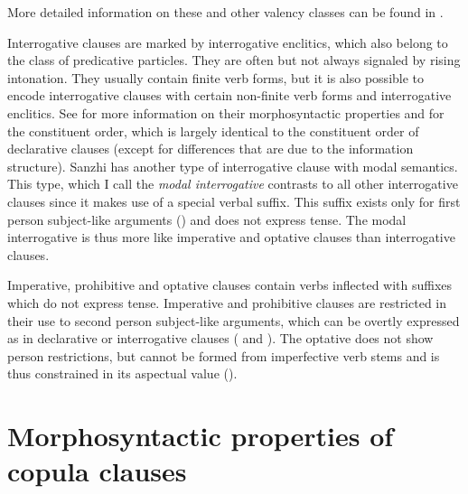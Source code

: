 More detailed information on these and other valency classes can be found in .

Interrogative clauses are marked by interrogative enclitics, which also belong to the class of predicative particles. They are often but not always signaled by rising intonation. They usually contain finite verb forms, but it is also possible to encode interrogative clauses with certain non-finite verb forms and interrogative enclitics. See  for more information on their morphosyntactic properties and  for the constituent order, which is largely identical to the constituent order of declarative clauses (except for differences that are due to the information structure). Sanzhi has another type of interrogative clause with modal semantics. This type, which I call the \textit{modal interrogative} contrasts to all other interrogative clauses since it makes use of a special verbal suffix. This suffix exists only for first person subject-like arguments () and does not express tense. The modal interrogative is thus more like imperative and optative clauses than interrogative clauses. 

Imperative, prohibitive and optative clauses contain verbs inflected with suffixes which do not express tense. Imperative and prohibitive clauses are restricted in their use to second person subject-like arguments, which can be overtly expressed as in declarative or interrogative clauses ( and ). The optative does not show person restrictions, but cannot be formed from imperfective verb stems and is thus constrained in its aspectual value ().




\section{Morphosyntactic properties of copula clauses}
\label{sec:copulaclauses}

